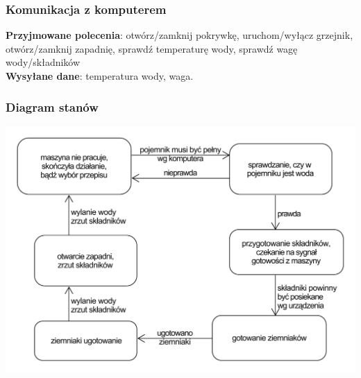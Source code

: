 \documentclass[12pt,a4paper,notitlepage]{article}
\begin{document}
\subsubsection{Komunikacja z komputerem}
\textbf{Przyjmowane polecenia}: otwórz/zamknij pokrywkę, uruchom/wyłącz grzejnik, otwórz/zamknij zapadnię, sprawdź temperaturę wody, sprawdź wagę wody/składników\\
\textbf{Wysyłane dane}: temperatura wody, waga.

\subsubsection{Diagram stanów}
\includegraphics[width=\textwidth,height=\textheight,keepaspectratio=true]{Diagram-stanow-pojemnik-na-ziemniaki.pdf}
\end{document}

